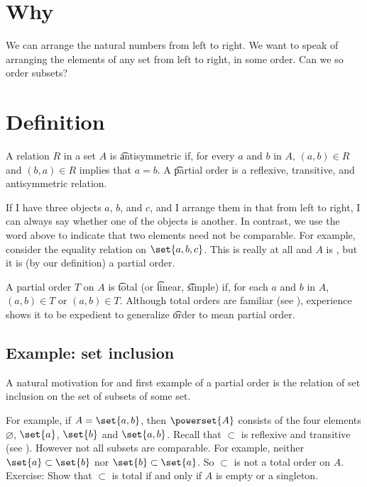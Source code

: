 
\section*{Why}

We can arrange the natural numbers from left to right.
We want to speak of arranging the elements of any set from left to right, in some order.
Can we so order subsets?

\section*{Definition}

A relation $R$ in a set $A$ is \t{antisymmetric} if, for every $a$ and $b$ in $A$, $(a, b) \in R$ and $(b, a) \in R$ implies that $a = b$.
A \t{partial order} is a reflexive, transitive, and antisymmetric relation.

If I have three objects $a$, $b$, and $c$, and I arrange them in that  from left to right, I can always say whether one of the objects is  another.
In contrast, we use the word  above to indicate that two elements need not be comparable.
For example, consider the equality relation on $\set{a, b, c}$.
This is really  at all and $A$ is , but it is (by our definition) a partial order.

A partial order $T$ on $A$ is \t{total} (or \t{linear}, \t{simple}) if, for each $a$ and $b$ in $A$, $(a, b) \in T$ or $(a, b) \in T$.
Although total orders are familiar (see ), experience shows it to be expedient to generalize \t{order} to mean partial order.

\subsection*{Example: set inclusion}

A natural motivation for and first example of a partial order is the relation of set inclusion on the set of subsets of some set.

For example, if $A = \set{a, b}$, then $\powerset{A}$ consists of the four elements $\varnothing$, $\set{a}$, $\set{b}$ and $\set{a,b}$.
Recall that $\subset$ is reflexive and transitive (see ).
However not all subsets are comparable.
For example, neither $\set{a} \subset \set{b}$ nor $\set{b} \subset \set{a}$.
So $\subset$ is not a total order on $A$.
Exercise: Show that $\subset$ is total if and only if $A$ is empty or a singleton.

